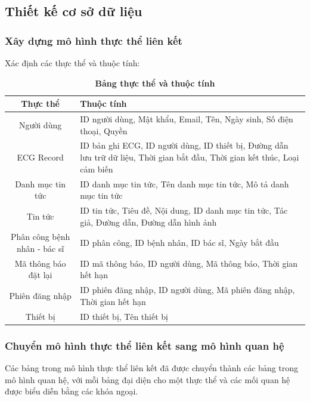 \documentclass{article}%
\begin{document}
\subsection{Thiết kế cơ sở dữ liệu}

\subsubsection{Xây dựng mô hình thực thể liên kết}

Xác định các thực thể và thuộc tính:


\begin{table}[H]
  \caption{\bfseries \fontsize{12pt}{0pt}\selectfont Bảng thực thể và thuộc tính}
  \centering
  \begin{tabularx}{0.9\textwidth}{|c|X|}
    \hline
    \textbf{Thực thể} & \textbf{Thuộc tính} \\
    \hline
    Người dùng & 
    ID người dùng, Mật khẩu, Email, Tên, Ngày sinh, Số điện thoại, Quyền \\
    \hline
    ECG Record & 
    ID bản ghi ECG, ID người dùng, ID thiết bị, Đường dẫn lưu trữ dữ liệu, Thời gian bắt đầu, Thời gian kết thúc, Loại cảm biến \\
    \hline
    Danh mục tin tức & 
    ID danh mục tin tức, Tên danh mục tin tức, Mô tả danh mục tin tức \\
    \hline
    Tin tức & 
    ID tin tức, Tiêu đề, Nội dung, ID danh mục tin tức, Tác giả, Đường dẫn, Đường dẫn hình ảnh \\
    \hline
    Phân công bệnh nhân - bác sĩ & 
    ID phân công, ID bệnh nhân, ID bác sĩ, Ngày bắt đầu \\
    \hline
    Mã thông báo đặt lại & 
    ID mã thông báo, ID người dùng, Mã thông báo, Thời gian hết hạn \\
    \hline
    Phiên đăng nhập & 
    ID phiên đăng nhập, ID người dùng, Mã phiên đăng nhập, Thời gian hết hạn \\
    \hline
    Thiết bị & 
    ID thiết bị, Tên thiết bị \\
    \hline
  \end{tabularx}
\end{table}



\subsubsection{Chuyển mô hình thực thể liên kết sang mô hình quan hệ}
Các bảng trong mô hình thực thể liên kết đã được chuyển thành các bảng trong mô hình quan hệ, với mỗi bảng đại diện cho một thực thể và các mối quan hệ được biểu diễn bằng các khóa ngoại.
\end{document}
